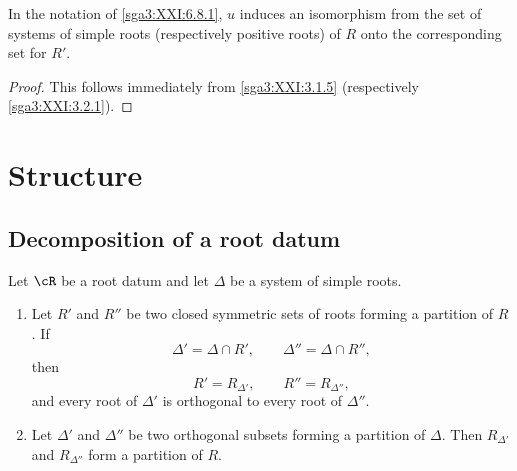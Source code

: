 \begin{proposition}\label{sga3:XXI:6.8.7}
In the notation of \ref{sga3:XXI:6.8.1}, \(u\) induces an
isomorphism from the set of systems of simple roots (respectively
positive roots) of \(R\) onto the corresponding set for \(R'\).
\end{proposition}

\begin{proof}
This follows immediately from \ref{sga3:XXI:3.1.5}
(respectively \ref{sga3:XXI:3.2.1}).
\end{proof}

\section{Structure}\label{sga3:XXI:7}

\subsection{Decomposition of a root datum}\label{sga3:XXI:7.1}

\begin{proposition}\label{sga3:XXI:7.1.1}
Let \(\cR\) be a root datum and let \(\Delta\) be a system of
simple roots.
\begin{enumerate}
\item[\SGAInlineRefTarget{sga3:XXI:7.1.1:item:i}(i)] Let \(R'\) and \(R''\) be two closed symmetric sets of
  roots forming a partition of \(R\). If
  \[
   \Delta'=\Delta\cap R',
   \qquad
   \Delta''=\Delta\cap R'',
  \]
  then
  \[
   R'=R_{\Delta'},
   \qquad
   R''=R_{\Delta''},
  \]
  and every root of \(\Delta'\) is orthogonal to every root of
  \(\Delta''\).
\item[\SGAInlineRefTarget{sga3:XXI:7.1.1:item:ii}(ii)] Let \(\Delta'\) and \(\Delta''\) be two orthogonal
  subsets forming a partition of \(\Delta\). Then
  \(R_{\Delta'}\) and \(R_{\Delta''}\) form a partition of \(R\).
\end{enumerate}
\end{proposition}


